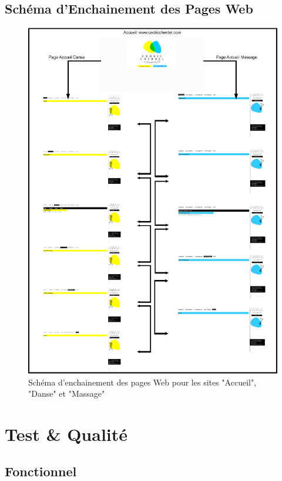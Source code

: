 \documentclass[11pt,a4paper,twoside]{report}
\begin{document}
			\subsection{Schéma d'Enchainement des Pages Web}
				\begin{figure}[H]
					\centering
					\includegraphics[width=17.5cm]{Schema-Enchainement-Pages.eps}
					\caption[Schéma d'enchainement des Pages Web]{Schéma d'enchainement des pages Web pour les sites "Accueil", "Danse" et "Massage"}
					\label{fig:Enchainement-Pages}
				\end{figure}

	\section{Test \& Qualité}
		\subsection{Fonctionnel}
\end{document}
